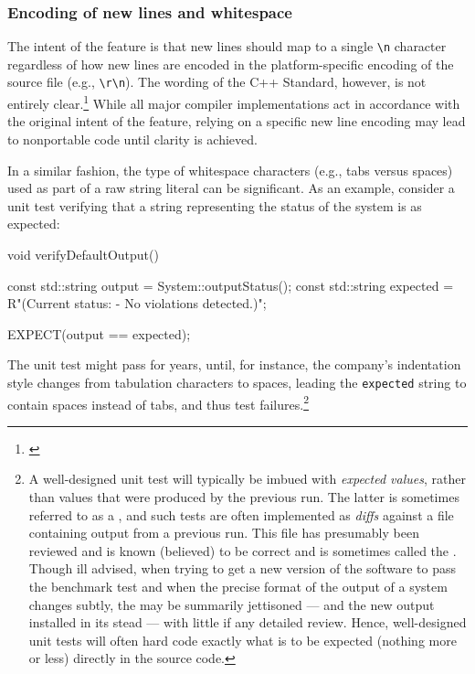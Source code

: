 \subsubsection[Encoding of new lines and whitespace]{Encoding of new lines and whitespace}\label{encoding-of-newlines-and-whitespace}

The intent of the feature is that new lines should map to a single
\lstinline!\n! character regardless of how new lines are encoded
in the platform-specific encoding of the source file (e.g., \lstinline!\r\n!). The wording of the C++ Standard, however, is not
entirely clear.\footnote{\cite{miller13}} While all major compiler
implementations act in accordance with the original intent of the
feature, relying on a specific new line encoding may lead to nonportable
code until clarity is achieved.

In a similar fashion, the type of whitespace characters (e.g., tabs
versus spaces) used as part of a raw string literal can be significant.
As an example, consider a unit test verifying that a string representing
the status of the system is as expected:

\begin{emcppslisting}[language=C++]
void verifyDefaultOutput()
{
    const std::string output = System::outputStatus();
    const std::string expected = R"(Current status:
    - No violations detected.)";

    EXPECT(output == expected);
}
\end{emcppslisting}
    
\noindent The unit test might pass for years, until, for instance, the
company's indentation style changes from tabulation characters to
spaces, leading the \lstinline!expected! string to contain spaces instead of tabs, and thus test failures.{\cprotect\footnote{A
well-designed unit test will typically be imbued with \emph{expected
values}, rather than values that were produced by the previous run.
The latter is sometimes referred to as a , and such tests are often implemented as \emph{diffs} against
a file containing output from a previous run. This file has
presumably been reviewed and is known (believed) to be correct and is sometimes called the . Though ill advised, when trying to get a new version of the software to pass the benchmark test and when the precise format of the output of a system
changes subtly, the  may be summarily jettisoned --- and the new
output installed in its stead --- with little if any detailed review.
Hence, well-designed unit tests will often hard code exactly what is
to be expected (nothing more or less) directly in the
   source code.}}

